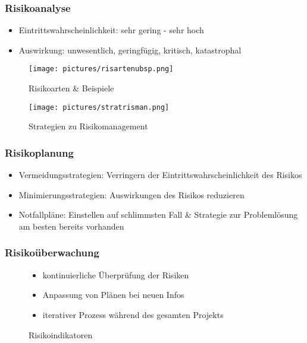 \documentclass[12pt,a4paper,oneside]{article}
\begin{document}
\subsubsection{Risikoanalyse}

\begin{itemize}
\item Eintrittswahrscheinlichkeit: sehr gering - sehr hoch
\item Auswirkung: unwesentlich, geringfügig, kritisch, katastrophal
\end{itemize}

\begin{figure}[H]
\begin{minipage}[t]{0.45\textwidth}
\centering
\texttt{[image: pictures/risartenubsp.png]}
\caption{Risikoarten \& Beispiele}
\end{minipage}
\hfill
\begin{minipage}[t]{0.5\textwidth}
\centering
\texttt{[image: pictures/stratrisman.png]}
\caption{Strategien zu Risikomanagement}
\end{minipage}
\end{figure}

\subsubsection{Risikoplanung}

\begin{itemize}
\item Vermeidungsstrategien: Verringern der Eintrittswahrscheinlichkeit des Risikos
\item Minimierungsstrategien: Auswirkungen des Risikos reduzieren
\item Notfallpläne: Einstellen auf schlimmsten Fall \& Strategie zur Problemlösung am besten bereits vorhanden
\end{itemize}

\subsubsection{Risikoüberwachung}

\begin{figure}[H]
\begin{minipage}[t]{0.5\textwidth}
\begin{itemize}
\item kontinuierliche Überprüfung der Risiken
\item Anpassung von Plänen bei neuen Infos
\item iterativer Prozess während des gesamten Projekts
\end{itemize}
\end{minipage}
\hfill
\begin{minipage}[t]{0.45\textwidth}
\centering
\vspace{-15mm}
\caption{Risikoindikatoren}
\end{minipage}
\end{figure}
\end{document}
